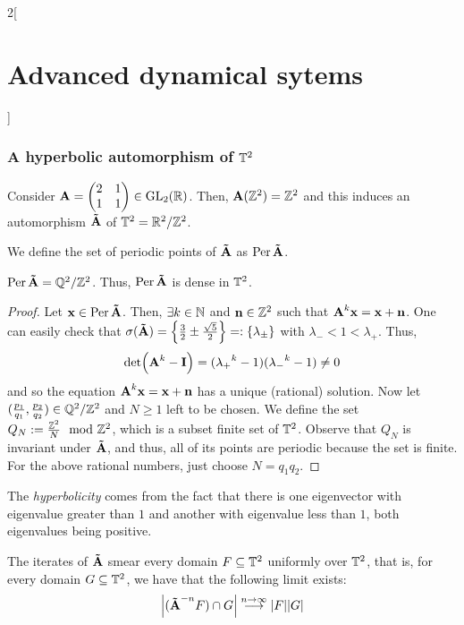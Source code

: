 \documentclass[../../../main_math.tex]{subfiles}
\begin{document}
\begin{multicols}{2}[\section{Advanced dynamical sytems}]
  \subsubsection{A hyperbolic automorphism of \texorpdfstring{$\mathbb{T}^2$}{T2}}
  \begin{proposition}
    Consider $\boldsymbol{\mathrm{A}}=\begin{pmatrix}
        2 & 1 \\
        1 & 1
      \end{pmatrix}\in \mathrm{GL}_2(\mathbb{R})$. Then, $\boldsymbol{\mathrm{A}}(\mathbb{Z}^2)=\mathbb{Z}^2$ and this induces an automorphism $\boldsymbol{\mathrm{\tilde{A}}}$ of $\TT^2=\quot{\RR^2}{\ZZ^2}$.
  \end{proposition}
  \begin{definition}
    We define the set of periodic points of $\boldsymbol{\mathrm{\tilde{A}}}$ as $\operatorname{Per}\boldsymbol{\mathrm{\tilde{A}}}$.
  \end{definition}
  \begin{lemma}
    $\Per\vf{\tilde{A}}=\quot{\QQ^2}{\ZZ^2}$. Thus, $\operatorname{Per}\boldsymbol{\mathrm{\tilde{A}}}$ is dense in $\mathbb{T}^2$.
  \end{lemma}
  \begin{proof}
    Let $\boldsymbol{\mathrm{x}}\in \operatorname{Per}\boldsymbol{\mathrm{\tilde{A}}}$. Then, $\exists k\in\mathbb{N}$ and $\boldsymbol{\mathrm{n}}\in\mathbb{Z}^2$ such that $\boldsymbol{\mathrm{A}}^k\boldsymbol{\mathrm{x}}=\boldsymbol{\mathrm{x}}+\boldsymbol{\mathrm{n}}$. One can easily check that $\sigma(\boldsymbol{\mathrm{\tilde{A}}})=\left\{\frac{3}{2}\pm \frac{\sqrt{5}}{2}\right\}=:\{\lambda_{\pm}\}$ with $\lambda_-<1<\lambda_+$. Thus,
    $$
      \det(\boldsymbol{\mathrm{A}}^k-\boldsymbol{\mathrm{I}})=({\lambda_+}^k-1)({\lambda_-}^k-1)\ne 0
    $$
    and so the equation $\boldsymbol{\mathrm{A}}^k\boldsymbol{\mathrm{x}}=\boldsymbol{\mathrm{x}}+\boldsymbol{\mathrm{n}}$ has a unique (rational) solution. Now let $(\frac{p_1}{q_1},\frac{p_2}{q_2})\in \quot{\QQ^2}{\ZZ^2}$ and $N\geq 1$ left to be chosen. We define the set $Q_N:=\frac{\mathbb{Z}^2}{N} \mod{\mathbb{Z}^2}$, which is a subset finite set of $\mathbb{T}^2$. Observe that $Q_N$ is invariant under $\boldsymbol{\mathrm{\tilde{A}}}$, and thus, all of its points are periodic because the set is finite. For the above rational numbers, just choose $N=q_1q_2$.
  \end{proof}
  \begin{remark}
    The \emph{hyperbolicity} comes from the fact that there is one eigenvector with eigenvalue greater than $1$ and another with eigenvalue less than $1$, both eigenvalues being positive.
  \end{remark}
  \begin{theorem}
    The iterates of $\boldsymbol{\mathrm{\tilde{A}}}$ smear every domain $F\subseteq \mathbb{T}^2$ uniformly over $\mathbb{T}^2$, that is, for every domain $G\subseteq \mathbb{T}^2$, we have that the following limit exists:
    $$
      \abs{(\boldsymbol{\mathrm{\tilde{A}}}^{-n} F)\cap G}\overset{n\to\infty}{\longrightarrow} \abs{F}\abs{G}
$$
\end{theorem}
\end{multicols}
\end{document}
